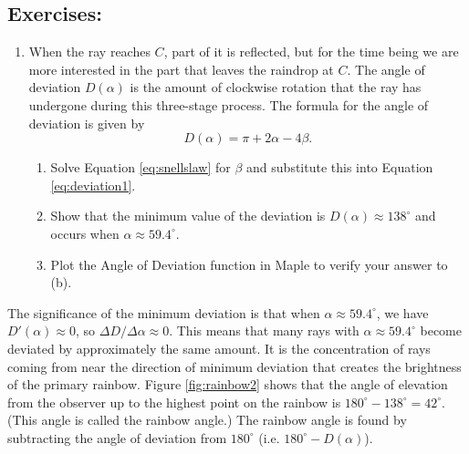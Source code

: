 \subsection*{Exercises:}
\begin{enumerate}
\item When the ray reaches $C$, part of it is reflected, but for the time being we are more interested in the part that leaves the raindrop at $C$. The angle of deviation $D(\alpha)$ is the amount of clockwise rotation that the ray has undergone during this three-stage process. The formula for the angle of deviation is given by
\begin{equation}
\label{eq:deviation1}
D(\alpha)=\pi + 2\alpha -4\beta.
\end{equation}
\clearpage
    \begin{enumerate}
    \item Solve Equation \eqref{eq:snellslaw} for $\beta$ and substitute this into Equation \eqref{eq:deviation1}.
    \item Show that the minimum value of the deviation is $D(\alpha) \approx 138^{\circ}$ and occurs when $\alpha \approx 59.4^\circ$. 
    \item Plot the Angle of Deviation function in Maple to verify your answer to (b). 
    \end{enumerate}
\end{enumerate}

The significance of the minimum deviation is that when $\alpha \approx 59.4^\circ$, we have $D'(\alpha)\approx 0$, so $\Delta D/\Delta \alpha \approx 0$. This means that many rays with $\alpha \approx 59.4^\circ$ become deviated by approximately the same amount. It is the concentration of rays coming from near the direction of minimum deviation that creates the brightness of the primary rainbow. Figure \ref{fig:rainbow2} shows that the angle of elevation from the observer up to the highest point on the rainbow is $180^\circ - 138^\circ=42^\circ$. (This angle is called the rainbow angle.) The rainbow angle is found by subtracting the angle of deviation from $180^\circ$ (i.e. $180^\circ - D(\alpha)$).
    
